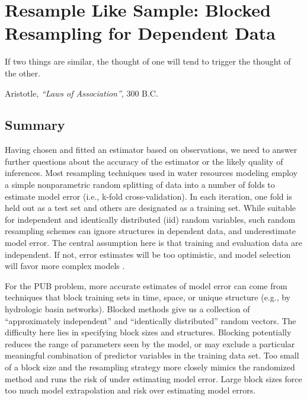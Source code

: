 \chapter[Resample Like Sample]{Resample Like Sample: Blocked Resampling for Dependent Data} \label{ch4:resampling}
\setlength{\epigraphwidth}{4.5in}
\epigraph{If two things are similar, the thought of one will tend to trigger the thought of the other.}{Aristotle, \textit{``Laws of Association''}, 300 B.C.}

\section*{Summary}
Having chosen and fitted an estimator based on observations, we need to answer further questions about the accuracy of the estimator or the likely quality of inferences. Most resampling techniques used in water resources modeling employ a simple nonparametric random splitting of data into a number of folds to estimate model error (i.e., k-fold cross-validation). In each iteration, one fold is held out as a test set and others are designated as a training set. While suitable for independent and identically distributed (iid) random variables, such random resampling schemes can ignore structures in dependent data, and underestimate model error. The central assumption here is that training and evaluation data are independent. If not, error estimates will be too optimistic, and model selection will favor more complex models \cite{roberts2017cross}. %

For the PUB problem, more accurate estimates of model error can come from techniques that block training sets in time, space, or unique structure (e.g., by hydrologic basin networks). Blocked methods give us a collection of ``approximately independent'' and ``identically distributed'' random vectors. The difficulty here lies in specifying block sizes and structures. Blocking potentially reduces the range of parameters seen by the model, or may exclude a particular meaningful combination of predictor variables in the training data set. Too small of a block size and the resampling strategy more closely mimics the randomized method and runs the risk of under estimating model error. Large block sizes force too much model extrapolation and risk over estimating model errors. 

